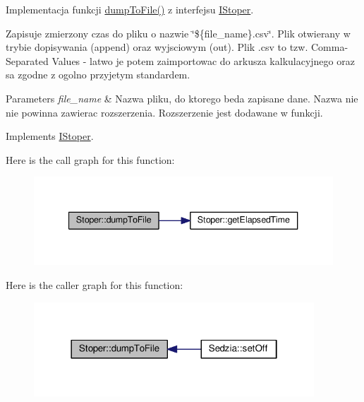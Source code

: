 Implementacja funkcji \hyperlink{class_stoper_a8896c3b2fa5428e29e5fef7f7bad3615}{dump\-To\-File()} z interfejsu \hyperlink{class_i_stoper}{I\-Stoper}. 

Zapisuje zmierzony czas do pliku o nazwie \char`\"{}\$\{file\-\_\-name\}.\-csv\char`\"{}. Plik otwierany w trybie dopisywania (append) oraz wyjsciowym (out). Plik .csv to tzw. Comma-\/\-Separated Values -\/ latwo je potem zaimportowac do arkusza kalkulacyjnego oraz sa zgodne z ogolno przyjetym standardem.


\begin{DoxyParams}{Parameters}
{\em file\-\_\-name} & Nazwa pliku, do ktorego beda zapisane dane. Nazwa nie nie powinna zawierac rozszerzenia. Rozszerzenie jest dodawane w funkcji. \\
\hline
\end{DoxyParams}


Implements \hyperlink{class_i_stoper_ab0ce71cfe9db23e9b0016990816c1be2}{I\-Stoper}.



Here is the call graph for this function\-:
\nopagebreak
\begin{figure}[H]
\begin{center}
\leavevmode
\includegraphics[width=340pt]{class_stoper_a8896c3b2fa5428e29e5fef7f7bad3615_cgraph}
\end{center}
\end{figure}




Here is the caller graph for this function\-:
\nopagebreak
\begin{figure}[H]
\begin{center}
\leavevmode
\includegraphics[width=298pt]{class_stoper_a8896c3b2fa5428e29e5fef7f7bad3615_icgraph}
\end{center}
\end{figure}



